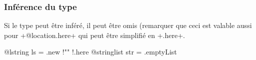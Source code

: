 \subsubsection{Inférence du type}

Si le type peut être inféré, il peut être omis (remarquer que ceci est valable aussi pour \ggst+@location.here+ qui peut être simplifié en \ggst+.here+.

\begin{galgas3}
@lstring ls = .new {!"" !.here}
@stringlist str = .emptyList
\end{galgas3}









